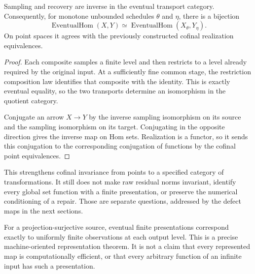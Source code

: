 \begin{theorem}\label{KS64}
Sampling and recovery are inverse in the eventual transport category. Consequently, for monotone unbounded schedules \(\theta\) and \(\eta\), there is a bijection
\[
 \operatorname{EventualHom}(X,Y)
 \simeq
 \operatorname{EventualHom}(X_\theta,Y_\eta).
\]
On point spaces it agrees with the previously constructed cofinal realization equivalences.
\end{theorem}
\begin{proof}
Each composite samples a finite level and then restricts to a level already required by the original input. At a sufficiently fine common stage, the restriction composition law identifies that composite with the identity. This is exactly eventual equality, so the two transports determine an isomorphism in the quotient category.

Conjugate an arrow \(X\to Y\) by the inverse sampling isomorphism on its source and the sampling isomorphism on its target. Conjugating in the opposite direction gives the inverse map on Hom sets. Realization is a functor, so it sends this conjugation to the corresponding conjugation of functions by the cofinal point equivalences.
\end{proof}
This strengthens cofinal invariance from points to a specified category of transformations. It still does not make raw residual norms invariant, identify every global set function with a finite presentation, or preserve the numerical conditioning of a repair. Those are separate questions, addressed by the defect maps in the next sections.

\begin{insight}
For a projection-surjective source, eventual finite presentations correspond exactly to uniformly finite observations at each output level. This is a precise machine-oriented representation theorem. It is not a claim that every represented map is computationally efficient, or that every arbitrary function of an infinite input has such a presentation.
\end{insight}
